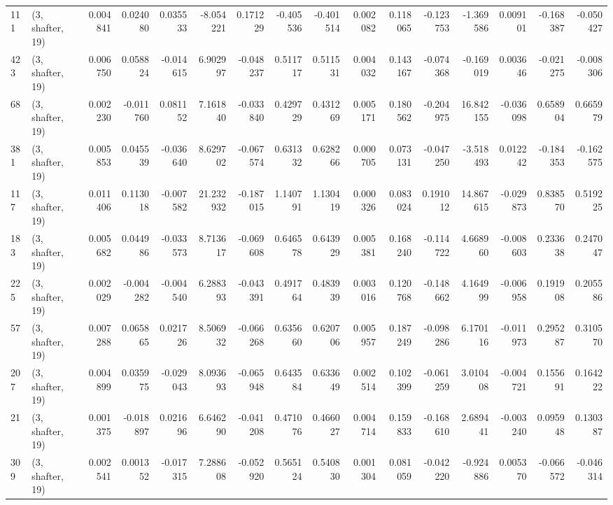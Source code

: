\begin{tabular}{llrrrrrrrrrrrrrr}
111 &  (3, shafter, 19) &   0.004841 &  0.024080 &  0.035533 &   -8.054221 &  0.171229 &  -0.405536 & -0.401514 &  0.002082 &  0.118065 & -0.123753 &   -1.369586 &  0.009101 & -0.168387 & -0.050427 \\
423 &  (3, shafter, 19) &   0.006750 &  0.058824 & -0.014615 &    6.902997 & -0.048237 &   0.511717 &  0.511531 &  0.004032 &  0.143167 & -0.074368 &   -0.169019 &  0.003646 & -0.021275 & -0.008306 \\
68  &  (3, shafter, 19) &   0.002230 & -0.011760 &  0.081152 &    7.161840 & -0.033840 &   0.429729 &  0.431269 &  0.005171 &  0.180562 & -0.204975 &   16.842155 & -0.036098 &  0.658904 &  0.665979 \\
381 &  (3, shafter, 19) &   0.005853 &  0.045539 & -0.036640 &    8.629702 & -0.067574 &   0.631332 &  0.628266 &  0.000705 &  0.073131 & -0.047250 &   -3.518493 &  0.012242 & -0.184353 & -0.162575 \\
117 &  (3, shafter, 19) &   0.011406 &  0.113018 & -0.007582 &   21.232932 & -0.187015 &   1.140791 &  1.130419 &  0.000326 &  0.083024 &  0.191012 &   14.867615 & -0.029873 &  0.838570 &  0.519225 \\
183 &  (3, shafter, 19) &   0.005682 &  0.044986 & -0.033573 &    8.713617 & -0.069608 &   0.646578 &  0.643929 &  0.005381 &  0.168240 & -0.114722 &    4.668960 & -0.008603 &  0.233638 &  0.247047 \\
225 &  (3, shafter, 19) &   0.002029 & -0.004282 & -0.004540 &    6.288393 & -0.043391 &   0.491764 &  0.483939 &  0.003016 &  0.120768 & -0.148662 &    4.164999 & -0.006958 &  0.191908 &  0.205586 \\
57  &  (3, shafter, 19) &   0.007288 &  0.065865 &  0.021726 &    8.506932 & -0.066268 &   0.635660 &  0.620706 &  0.005957 &  0.187249 & -0.098286 &    6.170116 & -0.011973 &  0.295287 &  0.310570 \\
207 &  (3, shafter, 19) &   0.004899 &  0.035975 & -0.029043 &    8.093693 & -0.065948 &   0.643584 &  0.633649 &  0.002514 &  0.102399 & -0.061259 &    3.010408 & -0.004721 &  0.155691 &  0.164222 \\
21  &  (3, shafter, 19) &   0.001375 & -0.018897 &  0.021696 &    6.646290 & -0.041208 &   0.471076 &  0.466027 &  0.004714 &  0.159833 & -0.168610 &    2.689441 & -0.003240 &  0.095948 &  0.130387 \\
309 &  (3, shafter, 19) &   0.002541 &  0.001352 & -0.017315 &    7.288608 & -0.052920 &   0.565124 &  0.540830 &  0.001304 &  0.081059 & -0.042220 &   -0.924886 &  0.005370 & -0.066572 & -0.046314 \\

\end{tabular}
